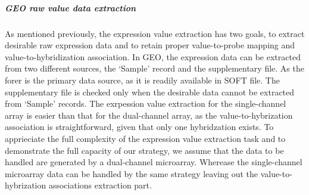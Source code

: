 







\subparagraph{GEO raw value data extraction}


As mentioned previously, the expression value extraction has two goals, to
extract desirable raw expression data and to retain proper value-to-probe
mapping and value-to-hybridization association.
%
In GEO, the expression data can be extracted from two different sources, the
`Sample' record and the supplementary file.
%
As the forer is the primary data source, as it is readily available in SOFT
file.  The supplementary file is checked only when the desirable data cannot
be extracted from `Sample' records.
%
The exrpession value extraction for the single-channel array is easier than
that for the dual-channel array, as the value-to-hybrization association is
straightforward, given that only one hybridzation exists.
%
To apprieciate the full complexity of the expression value extraction task
and to demonstrate the full capacity of our strategy, we assume that the data
to be handled are generated by a dual-channel microarray.  
%
Wherease the single-channel microarray data can be handled by the same
strategy leaving out the value-to-hybrization associations extraction part.





